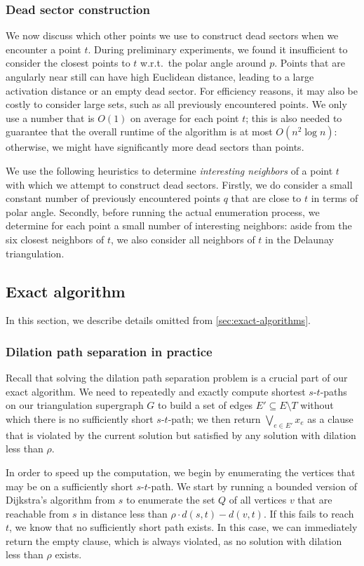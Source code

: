 \subsubsection{Dead sector construction}
We now discuss which other points we use to construct dead sectors when we encounter a point $t$.
During preliminary experiments, we found it insufficient to consider the closest points to $t$ w.r.t.\ the polar angle around $p$.
Points that are angularly near still can have high Euclidean distance, leading to a large activation distance or an empty dead sector.
For efficiency reasons, it may also be costly to consider large sets, such as all previously encountered points.
We only use a number that is $O(1)$ on average for each point $t$;
this is also needed to guarantee that the overall runtime of the algorithm is at most $O(n^2\log n)$:
otherwise, we might have significantly more dead sectors than points.

We use the following heuristics to determine \emph{interesting neighbors} of a point $t$ with which we attempt to construct dead sectors.
Firstly, we do consider a small constant number of previously encountered points $q$ that are close to $t$ in terms of polar angle.
Secondly, before running the actual enumeration process, we determine for each point a small number of interesting neighbors:
aside from the six closest neighbors of $t$, we also consider all neighbors of $t$ in the Delaunay triangulation.

\subsection{Exact algorithm}
In this section, we describe details omitted from \cref{sec:exact-algorithms}.

\subsubsection{Dilation path separation in practice}
\label{sec:practical-dilation-path-sep}
Recall that solving the dilation path separation problem is a crucial part of our exact algorithm.
We need to repeatedly and exactly compute shortest $s$-$t$-paths on our triangulation supergraph $G$
to build a set of edges $E' \subseteq E \setminus T$ without which there is no sufficiently short $s$-$t$-path;
we then return $\bigvee_{e \in E'} x_e$ as a clause that is violated by the current solution but satisfied by any solution with dilation less than $\rho$.

In order to speed up the computation, we begin by enumerating the vertices that may be on a sufficiently short $s$-$t$-path.
We start by running a bounded version of Dijkstra's algorithm from $s$ to enumerate the set $Q$ of all vertices $v$ that are reachable from $s$ in distance less than $\rho \cdot d(s,t) - d(v,t)$.
If this fails to reach $t$, we know that no sufficiently short path exists.
In this case, we can immediately return the empty clause, which is always violated, as no solution with dilation less than $\rho$ exists.

